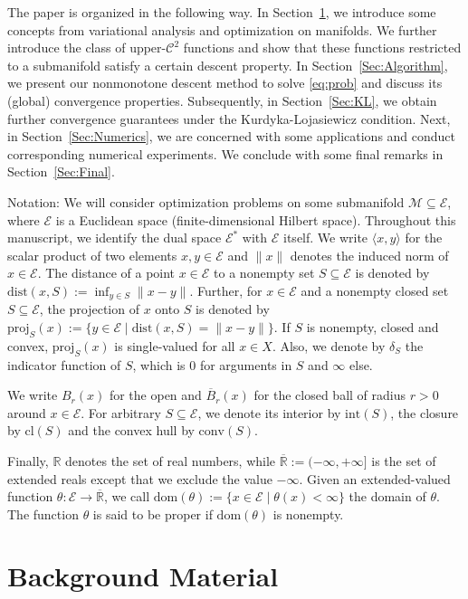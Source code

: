 \documentclass[a4paper, 12pt]{article}
\numberwithin{equation}{section}
\theoremstyle{bolddef}
\theoremstyle{definition}
\theoremstyle{boldplain}
\newcommand{\R}{\mathbb{R}}
\newcommand{\barR}{\overline{\mathbb{R}}}
\newcommand{\X}{\mathcal{E}}
\newcommand{\dom}{\mathrm{dom}}
\newcommand{\dist}{\mathrm{dist}}
\newcommand{\proj}{\mathrm{proj}}
\newcommand{\clball}{\overline{B}}
\begin{document}
The paper is organized in the following way. In Section~\ref{Sec:Background}, we introduce some concepts from variational analysis and optimization on manifolds. We further introduce the class of upper-$\mathcal{C}^2$ functions and show that these functions restricted to a submanifold satisfy a certain descent property. In Section~\ref{Sec:Algorithm}, we present our nonmonotone descent method to solve \eqref{eq:prob} and discuss its (global) convergence properties. Subsequently, in Section~\ref{Sec:KL}, we obtain further convergence guarantees under the Kurdyka-Lojasiewicz condition. Next, in Section~\ref{Sec:Numerics}, we are concerned with some applications and conduct corresponding numerical experiments. We conclude with some final remarks in Section~\ref{Sec:Final}.

Notation: We will consider optimization problems on some submanifold $\mathcal{M} \subseteq \X$, where $\X$ is a Euclidean space (finite-dimensional Hilbert space). Throughout this manuscript, we identify the dual space $\X^*$ with $ \X $ itself. We write $ \langle x, y \rangle $ for the scalar product of two elements $ x, y \in \X $ and $ \| x \| $ denotes the induced norm of $ x \in \X $. The distance of a point $ x \in \X $ to a nonempty set $ S \subseteq \X $ is denoted by $ \dist(x, S) := \inf_{y \in  S} \| x - y \| $. Further, for $x \in \X$ and a nonempty closed set $S \subseteq \X$, the projection of $x$ onto $S$ is denoted by $\proj_S(x) := \{ y \in \X \mid \dist(x, S) = \|x-y\| \}$. If $S$ is nonempty, closed and convex, $\proj_S(x)$ is single-valued for all $x \in X$. Also, we denote by $\delta_S$ the indicator function of $S$, which is $0$ for arguments in $S$ and $\infty$ else.

We write $B_r(x)$ for the open and $\clball_r(x)$ for the closed ball of radius $r>0$ around $x \in \X$. For arbitrary $S \subseteq \X$, we denote its interior by $\mathrm{int}(S)$, the closure by $\mathrm{cl}(S)$ and the convex hull by $\mathrm{conv}(S)$.

Finally, $ \R $ denotes the set of real numbers, while $ \barR := (- \infty, 
+ \infty ] $ is the set of extended reals except that we exclude the
value $ - \infty $. Given an extended-valued function $ \theta: 
\X \to \barR $, we call $ \dom (\theta) := 
\{ x \in \X \mid \theta (x)  < \infty \} $
the domain of $ \theta $. The function $ \theta $ is said to
be proper if $ \dom (\theta) $ is nonempty. 


\section{Background Material}\label{Sec:Background}
\end{document}
